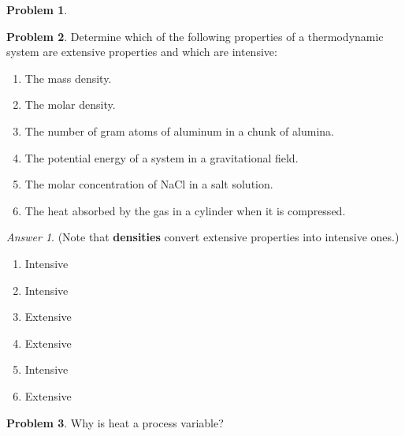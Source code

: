 \documentclass[a4paper, 12pt]{article}
\theoremstyle{definition}
\newtheorem{problem}{Problem}[section]
\theoremstyle{remark}
\newtheorem*{answer}{Answer}
\begin{document}
\begin{problem}
\end{problem}

\begin{problem}
    Determine which of the following properties of a thermodynamic system are
    extensive properties and which are intensive:
    \begin{enumerate}
        \item The mass density.
        \item The molar density.
        \item The number of gram atoms of aluminum in a chunk of alumina.
        \item The potential energy of a system in a gravitational field.
        \item The molar concentration of NaCl in a salt solution.
        \item The heat absorbed by the gas in a cylinder when it is compressed.
    \end{enumerate}

    \begin{answer}
        (Note that \textbf{densities} convert extensive properties into
        intensive ones.)
        \begin{enumerate}
            \item Intensive
            \item Intensive
            \item Extensive
            \item Extensive
            \item Intensive
            \item Extensive
        \end{enumerate}
    \end{answer}
\end{problem}

\begin{problem}
    Why is heat a process variable?
\end{problem}
\end{document}
